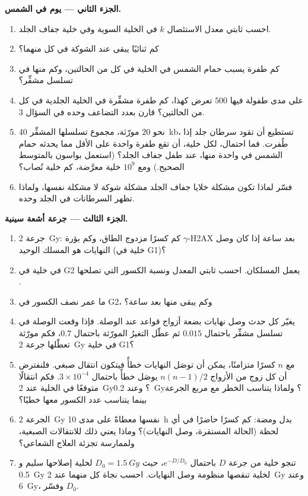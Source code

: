 \begin{problem}
\medskip
\noindent\textbf{الجزء الثاني --- يوم في الشمس.}
\begin{enumerate}[resume]
  \item احسب ثابتي معدل الاستئصال $k$ في الخلية السوية وفي خلية
        جفاف الجلد.
  \item كم ثنائيًا يبقى عند الشوكة في كل منهما؟
  \item كم طفرة يسبب حمام الشمس في الخلية في كل من الحالتين، وكم
        منها في تسلسل مشفِّر؟
  \item على مدى طفولة فيها $500$ تعرض كهذا، كم طفرة مشفِّرة في
        الخلية الجلدية في كل من الحالتين؟ قارن بعدد
        التضاعف وحده في السؤال 3.
  \item نحو $20$ مورّثة، مجموع تسلسلها المشفِّر \qty{40}{kb}،
        تستطيع أن تقود سرطان جلد إذا طُفرت. فما احتمال،
        لكل خلية، أن تقع طفرة واحدة على الأقل مما يحدثه حمام
        الشمس في واحدة منها، عند طفل جفاف الجلد؟
        (استعمل بواسون بالمتوسط الصحيح.) ومع $10^{9}$ خلية معرَّضة،
        كم خلية تُصاب؟
  \item فسّر لماذا تكون مشكلة خلايا جفاف الجلد مشكلة شوكة لا مشكلة
         نفسها، ولماذا تظهر السرطانات في الجلد وحده.
\end{enumerate}

\medskip
\noindent\textbf{الجزء الثالث --- جرعة أشعة سينية.}
\begin{enumerate}[resume]
  \item جرعة \qty{2}{Gy}: كم كسرًا مزدوج الطاق، وكم بؤرة
        $\gamma$-H2AX بعد ساعة إذا كان وصل النهايات هو المسلك
        الوحيد (خلية في G1)؟
  \item في خلية في G2 يعمل المسلكان. احسب ثابتي المعدل
        ونسبة الكسور التي تصلحها .
  \item ما عمر نصف الكسور في G2، وكم يبقى منها
        بعد ساعة؟
  \item يغيّر كل حدث وصل نهايات بضعة أزواج قواعد عند الوصلة. فإذا
        وقعت الوصلة في تسلسل مشفِّر باحتمال $0.015$ ثم
        عطّل التغيرُ المورّثة باحتمال $0.7$،
        فكم مورّثة تعطّلها جرعة \qty{2}{Gy} في خلية G1؟
  \item مع $n$ كسرًا متزامنًا، يمكن أن توصَل النهايات خطأً فيتكون
        انتقال صبغي. فلنفترض أن كل زوج من الأزواج $n(n-1)/2$
        يوصَل خطأً باحتمال $3\times 10^{-4}$. فكم انتقالًا
        متوقعًا في الخلية عند \qty{2}{Gy}؟ وعند \qty{0.2}{Gy}؟ ولماذا
        يتناسب الخطر مع مربع الجرعة بينما يتناسب عدد
        الكسور معها خطيًا؟
  \item الجرعة \qty{2}{Gy} نفسها معطاةً على مدى \qty{10}{h} بدل
        ومضة: كم كسرًا حاضرًا في أي لحظة (الحالة
        المستقرة، وصل النهايات)؟ وماذا يعني ذلك للانتقالات
        الصبغية، ولممارسة تجزئة العلاج الشعاعي؟
  \item تنجو خلية من جرعة $D$ باحتمال $e^{-D/D_{0}}$، حيث
        $D_{0} = \qty{1.5}{Gy}$ لخلية إصلاحها سليم و
        \qty{0.5}{Gy} لخلية تنقصها منظومة وصل النهايات. احسب نجاة
        كل منهما عند \qty{2}{Gy} وعند \qty{6}{Gy}، وفسّر $D_{0}$.
\end{enumerate}


\end{problem}
